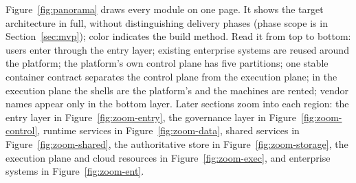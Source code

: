 Figure~\ref{fig:panorama} draws every module on one page. It shows the target architecture in full, without distinguishing delivery phases (phase scope is in Section~\ref{sec:mvp}); color indicates the build method. Read it from top to bottom: users enter through the entry layer; existing enterprise systems are reused around the platform; the platform's own control plane has five partitions; one stable container contract separates the control plane from the execution plane; in the execution plane the shells are the platform's and the machines are rented; vendor names appear only in the bottom layer. Later sections zoom into each region: the entry layer in Figure~\ref{fig:zoom-entry}, the governance layer in Figure~\ref{fig:zoom-control}, runtime services in Figure~\ref{fig:zoom-data}, shared services in Figure~\ref{fig:zoom-shared}, the authoritative store in Figure~\ref{fig:zoom-storage}, the execution plane and cloud resources in Figure~\ref{fig:zoom-exec}, and enterprise systems in Figure~\ref{fig:zoom-ent}.

